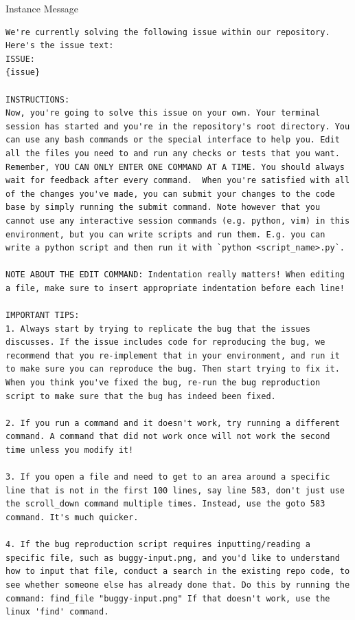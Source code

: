 {
\begin{fileviewerbox}{Instance Message}
\begin{Verbatim}[breaklines=true]
We're currently solving the following issue within our repository.
Here's the issue text:
ISSUE:
{issue}

INSTRUCTIONS:
Now, you're going to solve this issue on your own. Your terminal session has started and you're in the repository's root directory. You can use any bash commands or the special interface to help you. Edit all the files you need to and run any checks or tests that you want.  Remember, YOU CAN ONLY ENTER ONE COMMAND AT A TIME. You should always wait for feedback after every command.  When you're satisfied with all of the changes you've made, you can submit your changes to the code base by simply running the submit command. Note however that you cannot use any interactive session commands (e.g. python, vim) in this environment, but you can write scripts and run them. E.g. you can write a python script and then run it with `python <script_name>.py`.

NOTE ABOUT THE EDIT COMMAND: Indentation really matters! When editing a file, make sure to insert appropriate indentation before each line! 

IMPORTANT TIPS:
1. Always start by trying to replicate the bug that the issues discusses. If the issue includes code for reproducing the bug, we recommend that you re-implement that in your environment, and run it to make sure you can reproduce the bug. Then start trying to fix it. When you think you've fixed the bug, re-run the bug reproduction script to make sure that the bug has indeed been fixed.

2. If you run a command and it doesn't work, try running a different command. A command that did not work once will not work the second time unless you modify it!

3. If you open a file and need to get to an area around a specific line that is not in the first 100 lines, say line 583, don't just use the scroll_down command multiple times. Instead, use the goto 583 command. It's much quicker. 
 
4. If the bug reproduction script requires inputting/reading a specific file, such as buggy-input.png, and you'd like to understand how to input that file, conduct a search in the existing repo code, to see whether someone else has already done that. Do this by running the command: find_file "buggy-input.png" If that doesn't work, use the linux 'find' command. 


\end{Verbatim}
\end{fileviewerbox}}
